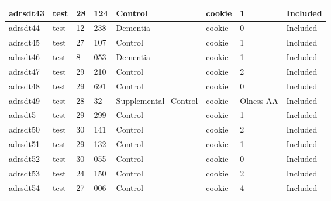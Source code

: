\begin{center}
\begin{longtable}{|l|l|l|l|l|l|l|l|}
adrsdt43       & test                  & 28              & 124                & Control              & cookie          & 1                & Included      \\ \hline
adrsdt44       & test                  & 12              & 238                & Dementia             & cookie          & 0                & Included      \\ \hline
adrsdt45       & test                  & 27              & 107                & Control              & cookie          & 1                & Included      \\ \hline
adrsdt46       & test                  & 8               & 053                & Dementia             & cookie          & 1                & Included      \\ \hline
adrsdt47       & test                  & 29              & 210                & Control              & cookie          & 2                & Included      \\ \hline
adrsdt48       & test                  & 29              & 691                & Control              & cookie          & 0                & Included      \\ \hline
adrsdt49       & test                  & 28              & 32                 & Supplemental\_Control & cookie          & Olness-AA        & Included      \\ \hline
adrsdt5        & test                  & 29              & 299                & Control              & cookie          & 1                & Included      \\ \hline
adrsdt50       & test                  & 30              & 141                & Control              & cookie          & 2                & Included      \\ \hline
adrsdt51       & test                  & 29              & 132                & Control              & cookie          & 1                & Included      \\ \hline
adrsdt52       & test                  & 30              & 055                & Control              & cookie          & 0                & Included      \\ \hline
adrsdt53       & test                  & 24              & 150                & Control              & cookie          & 2                & Included      \\ \hline
adrsdt54       & test                  & 27              & 006                & Control              & cookie          & 4                & Included      \\ \hline

\end{longtable}
\end{center}
